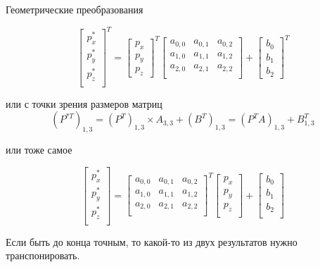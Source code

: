 \documentclass{beamer}
\begin{document}
\begin{frame}{Геометрические преобразования}
{		\[
			\begin{bmatrix}
				p_x^{*} \\
				p_y^{*} \\
				p_z^{*} \\
			\end{bmatrix}^T
			=
			\begin{bmatrix}
				p_x \\
				p_y \\
				p_z
			\end{bmatrix}^T
			\begin{bmatrix}
				a_{0,0} & a_{0,1} & a_{0,2}  \\
				a_{1,0} & a_{1,1} & a_{1,2}  \\
				a_{2,0} & a_{2,1} & a_{2,2}  \\
			\end{bmatrix}
			+
			\begin{bmatrix}
				b_0 \\
				b_1 \\
				b_2
			\end{bmatrix}^T
		\]

		или с точки зрения размеров матриц
		\[
			(P^{*T})_{1,3}
			=(P^T)_{1,3} \times A_{3,3}+(B^T)_{1,3} 
			=(P^TA)_{1,3}+B_{1,3}^T 
			\]

		или тоже самое

		\[
			\begin{bmatrix}
				p_x^{*} \\
				p_y^{*} \\
				p_z^{*} \\
			\end{bmatrix}
			=
			\begin{bmatrix}
				a_{0,0} & a_{0,1} & a_{0,2}  \\
				a_{1,0} & a_{1,1} & a_{1,2}  \\
				a_{2,0} & a_{2,1} & a_{2,2}  \\
			\end{bmatrix}^T
			\begin{bmatrix}
				p_x \\
				p_y \\
				p_z \\
			\end{bmatrix}
			+
			\begin{bmatrix}
				b_0 \\
				b_1 \\
				b_2 \\
			\end{bmatrix}
		\]

		Если быть до конца точным, то какой-то из двух результатов нужно транспонировать.
		}
	\end{frame}
\end{document}
